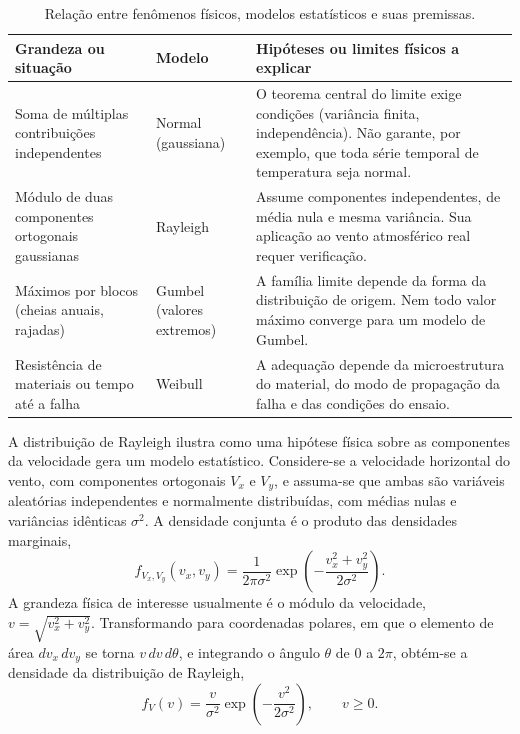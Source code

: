 \begin{table}[htbp]
\centering
\caption{Relação entre fenômenos físicos, modelos estatísticos e suas premissas.}
\label{tab:modelos_fisicos}
\small
\begin{tabular}{p{3.8cm} p{2.4cm} p{7.8cm}}
\toprule
\textbf{Grandeza ou situação} & \textbf{Modelo} & \textbf{Hipóteses ou limites físicos a explicar} \\
\midrule
Soma de múltiplas contribuições independentes & Normal (gaussiana) & O teorema central do limite exige condições (variância finita, independência). Não garante, por exemplo, que toda série temporal de temperatura seja normal. \\
Módulo de duas componentes ortogonais gaussianas & Rayleigh & Assume componentes independentes, de média nula e mesma variância. Sua aplicação ao vento atmosférico real requer verificação. \\
Máximos por blocos (cheias anuais, rajadas) & Gumbel (valores extremos) & A família limite depende da forma da distribuição de origem. Nem todo valor máximo converge para um modelo de Gumbel. \\
Resistência de materiais ou tempo até a falha & Weibull & A adequação depende da microestrutura do material, do modo de propagação da falha e das condições do ensaio. \\
\bottomrule
\end{tabular}
\end{table}

A distribuição de Rayleigh ilustra como uma hipótese física sobre as componentes da velocidade gera um modelo estatístico. Considere-se a velocidade horizontal do vento, com componentes ortogonais $V_x$ e $V_y$, e assuma-se que ambas são variáveis aleatórias independentes e normalmente distribuídas, com médias nulas e variâncias idênticas $\sigma^2$. A densidade conjunta é o produto das densidades marginais,
\begin{equation}
    f_{V_x,V_y}(v_x, v_y) = \frac{1}{2\pi\sigma^2} \exp\left( -\frac{v_x^2 + v_y^2}{2\sigma^2} \right).
\end{equation}
A grandeza física de interesse usualmente é o módulo da velocidade, $v = \sqrt{v_x^2 + v_y^2}$. Transformando para coordenadas polares, em que o elemento de área $dv_x\,dv_y$ se torna $v\,dv\,d\theta$, e integrando o ângulo $\theta$ de $0$ a $2\pi$, obtém-se a densidade da distribuição de Rayleigh,
\begin{equation}
    f_V(v) = \frac{v}{\sigma^2} \exp\left( -\frac{v^2}{2\sigma^2} \right), \qquad v \geq 0.
    \label{eq:rayleigh}
\end{equation}

